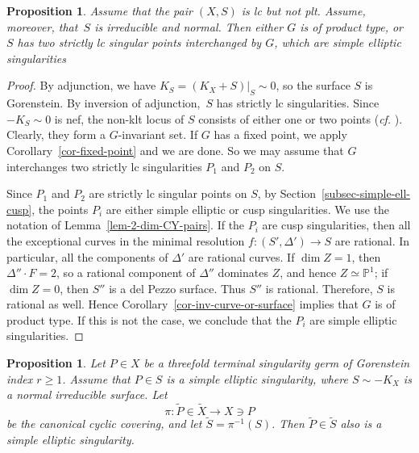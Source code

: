\documentclass[11pt]{amsart}
\numberwithin{equation}{section}
\newtheorem{proposition}[thm]{Proposition}
\theoremstyle{definition}
\theoremstyle{remark}
\newcommand{\lra}{\longrightarrow}
\begin{document}
\begin{proposition}
\label{the-pair-is-strictly-lc-irred}
Assume that the pair $(X, S)$ is lc but not plt. 
Assume, moreover, that~$S$ is
irreducible and normal. Then either $G$ is of product type, or $S$ has two strictly lc singular points interchanged by $G$, which are simple elliptic singularities
\end{proposition}

\begin{proof}
By adjunction, we have $K_S=(K_X+S)|_S\sim 0$, so the surface $S$ is Gorenstein. By inversion of adjunction,~$S$ has strictly lc singularities. 
Since $-K_S\sim 0$ is nef, the non-klt locus of $S$ consists of either one or two points (\textit{cf.} \cite[Theorem 1.2]{B24}). Clearly, they form a $G$-invariant set. 
If $G$ has a fixed point, we apply Corollary~\ref{cor-fixed-point} and we are done. So we may assume that $G$ interchanges two strictly lc singularities $P_1$ and $P_2$ on $S$. 

Since $P_1$ and $P_2$ are strictly lc singular points on $S$, by Section~\ref{subsec-simple-ell-cusp}, the points $P_i$ are either simple elliptic or cusp singularities. 
We use the notation of Lemma~\ref{lem-2-dim-CY-pairs}. If the $P_i$ are cusp singularities, then all the exceptional curves in the minimal resolution $f\colon (S',\Delta')\to S$ are rational. In particular, all the components of $\Delta'$ are rational curves.
If $\dim Z=1$, then $\Delta''\cdot F=2$, so a rational component of $\Delta''$ dominates $Z$, and hence $Z\simeq\mathbb P^1$; if $\dim Z=0$, then $S''$ is a del Pezzo surface. Thus $S''$ is rational. Therefore, $S$ is rational as well. Hence Corollary~\ref{cor-inv-curve-or-surface} implies that $G$ is of product type. If this is not the case, we conclude that the $P_i$ are simple elliptic singularities.
\end{proof}

\begin{proposition}
\label{prop-elliptic-small-embedding-dimension}
Let $P\in X$ be a threefold terminal singularity germ of Gorenstein index $r\geq 1$. Assume that $P\in S$ is a simple elliptic singularity, where $S\sim -K_X$ is a normal irreducible surface. Let 
\[
\pi\colon \widetilde{P}\in\widetilde{X}\lra X\ni P
\] 
be the canonical cyclic covering, and let $\widetilde{S}=\pi^{-1}(S)$. 
Then $\widetilde{P}\in\widetilde{S}$ also is a simple elliptic singularity.
\end{proposition}
\end{document}
